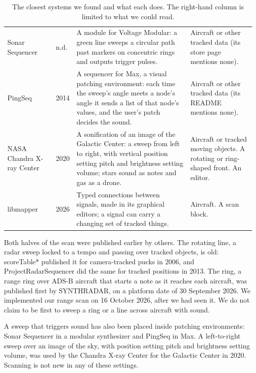 \documentclass[11pt,letterpaper]{article}
\begin{document}
\begin{table}[p]
\begin{tabular}{@{}L{4.0cm}L{0.9cm}L{5.2cm}L{4.2cm}@{}}
Sonar Sequencer~\cite{playertron2026sonarsequencer} & n.d. & A module for Voltage Modular: a green line sweeps a circular path past markers on concentric rings and outputs trigger pulses. & Aircraft or other tracked data (its store page mentions none).\\
PingSeq~\cite{mooy2014pingseq} & 2014 & A sequencer for Max, a visual patching environment: each time the sweep's angle meets a node's angle it sends a list of that node's values, and the user's patch decides the sound. & Aircraft or other tracked data (its README mentions none).\\
NASA Chandra X-ray Center~\cite{nasa2020sonification} & 2020 & A sonification of an image of the Galactic Center: a sweep from left to right, with vertical position setting pitch and brightness setting volume; stars sound as notes and gas as a drone. & Aircraft or tracked moving objects. A rotating or ring-shaped front. An editor.\\
libmapper~\cite{libmapper2026} & 2026 & Typed connections between signals, made in its graphical editors; a signal can carry a changing set of tracked things. & Aircraft. A scan block.\\
\bottomrule
\end{tabular}
\caption{The closest systems we found and what each does. The right-hand column is limited to what we could read.}
\label{tab:related}
\end{table}

Both halves of the scan were published earlier by others. The rotating line, a radar sweep locked to a tempo and passing over tracked objects, is old: scoreTable* published it for camera-tracked pucks in 2006, and ProjectRadarSequencer did the same for tracked positions in 2013. The ring, a range ring over ADS-B aircraft that starts a note as it reaches each aircraft, was published first by SYNTHRADAR, on a platform date of 30 September 2026. We implemented our range scan on 16 October 2026, after we had seen it. We do not claim to be first to sweep a ring or a line across aircraft with sound.

A sweep that triggers sound has also been placed inside patching environments: Sonar Sequencer in a modular synthesizer and PingSeq in Max. A left-to-right sweep over an image of the sky, with position setting pitch and brightness setting volume, was used by the Chandra X-ray Center for the Galactic Center in 2020. Scanning is not new in any of these settings.
\end{document}

